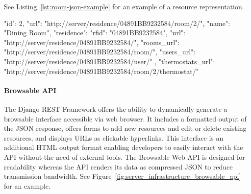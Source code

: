 See Listing~\ref{lst:room-json-example} for an example of a resource representation.

\begin{snippet}[language=JavaScript,label={lst:room-json-example},caption={Example representation of the Room resource at \nolinkurl{http://server/residence/04891BB9232584/room/2/}.
		The \highlight{url} field determines the URL of the represented resource.
		Within the \highlight{residence} field the representation of the associated Residence resource is nested.
		The included Residence representation has its own \highlight{url} field.
		Collections of the Residence's Rooms and Users are not nested but referenced via URL to limit the response size.}]
	{
		"id": 2,
		"url": "http://server/residence/04891BB9232584/room/2/",
		"name": "Dining Room",
		"residence": {
			"rfid": "04891BB9232584",
			"url": "http://server/residence/04891BB9232584/",
			"rooms_url": "http://server/residence/04891BB9232584/room/",
			"users_url": "http://server/residence/04891BB9232584/user/"
		},
		"thermostats_url": "http://server/residence/04891BB9232584/room/2/thermostat/"
	}
\end{snippet}


\paragraph{Browsable API}

The Django REST Framework offers the ability to dynamically generate a browsable interface accessible via web browser.
It includes a formatted output of the JSON response, offers forms to add new resources and edit or delete existing resources, and displays URLs as clickable hyperlinks.
This interface is an additional HTML output format enabling developers to easily interact with the API without the need of external tools.
The Browsable Web API is designed for readability whereas the API renders its data as compressed JSON to reduce transmission bandwidth. 
See Figure~\ref{fig:server_infrastructure_browsable_api} for an example.

